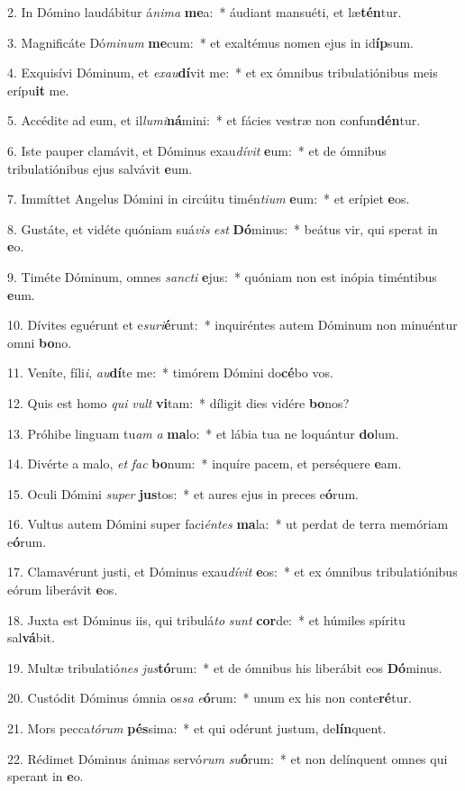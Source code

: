 2. In Dómino laudábitur á\textit{ni}\textit{ma} \textbf{me}a:~*  áudiant mansuéti, et læ\textbf{tén}tur.\

3. Magnificáte Dó\textit{mi}\textit{num} \textbf{me}cum:~*  et exaltémus nomen ejus in id\textbf{íp}sum.\

4. Exquisívi Dóminum, et \textit{ex}\textit{au}\textbf{dí}vit me:~*  et ex ómnibus tribulatiónibus meis erípu\textbf{it} me.\

5. Accédite ad eum, et il\textit{lu}\textit{mi}\textbf{ná}mini:~*  et fácies vestræ non confun\textbf{dén}tur.\

6. Iste pauper clamávit, et Dóminus exau\textit{dí}\textit{vit} \textbf{e}um:~*  et de ómnibus tribulatiónibus ejus salvávit \textbf{e}um.\

7. Immíttet Angelus Dómini in circúitu timén\textit{ti}\textit{um} \textbf{e}um:~*  et erípiet \textbf{e}os.\

8. Gustáte, et vidéte quóniam suá\textit{vis} \textit{est} \textbf{Dó}minus:~*  beátus vir, qui sperat in \textbf{e}o.\

9. Timéte Dóminum, omnes \textit{sanc}\textit{ti} \textbf{e}jus:~*  quóniam non est inópia timéntibus \textbf{e}um.\

10. Dívites eguérunt et e\textit{su}\textit{ri}\textbf{é}runt:~*  inquiréntes autem Dóminum non minuéntur omni \textbf{bo}no.\

11. Veníte, fíli\textit{i}, \textit{au}\textbf{dí}te me:~*  timórem Dómini do\textbf{cé}bo vos.\

12. Quis est homo \textit{qui} \textit{vult} \textbf{vi}tam:~*  díligit dies vidére \textbf{bo}nos?\

13. Próhibe linguam tu\textit{am} \textit{a} \textbf{ma}lo:~*  et lábia tua ne loquántur \textbf{do}lum.\

14. Divérte a malo, \textit{et} \textit{fac} \textbf{bo}num:~*  inquíre pacem, et perséquere \textbf{e}am.\

15. Oculi Dómini \textit{su}\textit{per} \textbf{jus}tos:~*  et aures ejus in preces e\textbf{ó}rum.\

16. Vultus autem Dómini super faci\textit{én}\textit{tes} \textbf{ma}la:~*  ut perdat de terra memóriam e\textbf{ó}rum.\

17. Clamavérunt justi, et Dóminus exau\textit{dí}\textit{vit} \textbf{e}os:~*  et ex ómnibus tribulatiónibus eórum liberávit \textbf{e}os.\

18. Juxta est Dóminus iis, qui tribulá\textit{to} \textit{sunt} \textbf{cor}de:~*  et húmiles spíritu sal\textbf{vá}bit.\

19. Multæ tribulatió\textit{nes} \textit{jus}\textbf{tó}rum:~*  et de ómnibus his liberábit eos \textbf{Dó}minus.\

20. Custódit Dóminus ómnia os\textit{sa} \textit{e}\textbf{ó}rum:~*  unum ex his non conte\textbf{ré}tur.\

21. Mors pecca\textit{tó}\textit{rum} \textbf{pés}sima:~*  et qui odérunt justum, de\textbf{lín}quent.\

22. Rédimet Dóminus ánimas servó\textit{rum} \textit{su}\textbf{ó}rum:~*  et non delínquent omnes qui sperant in \textbf{e}o.\

